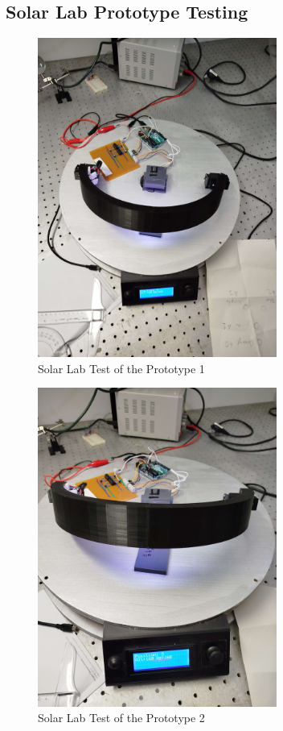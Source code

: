\subsection{Solar Lab Prototype Testing}

\begin{figure}[htbp]
    \centering
    \includegraphics[width=0.7\textwidth]{figures/methodology/Prototype_testing/solarLab_test1.jpg}
    \caption*{Solar Lab Test of the Prototype 1} 
    \label{fig:Solar-Lab-Test-Prototype1}
    \end{figure}

\begin{figure}[htbp]
        \centering
        \includegraphics[width=0.7\textwidth]{figures/methodology/Prototype_testing/solarLab_test2.jpg}
        \caption*{Solar Lab Test of the Prototype 2} 
        \label{fig:Solar-Lab-Test-Prototype2}
        \end{figure}


